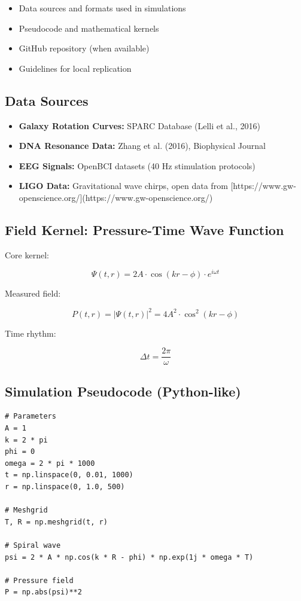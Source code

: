 \documentclass[a4paper,12pt]{article}
\begin{document}
\begin{itemize}
    \item Data sources and formats used in simulations
    \item Pseudocode and mathematical kernels
    \item GitHub repository (when available)
    \item Guidelines for local replication
\end{itemize}

\subsection{Data Sources}

\begin{itemize}
    \item \textbf{Galaxy Rotation Curves:} SPARC Database (Lelli et al., 2016)
    \item \textbf{DNA Resonance Data:} Zhang et al. (2016), Biophysical Journal
    \item \textbf{EEG Signals:} OpenBCI datasets (40 Hz stimulation protocols)
    \item \textbf{LIGO Data:} Gravitational wave chirps, open data from [https://www.gw-openscience.org/](https://www.gw-openscience.org/)
\end{itemize}

\subsection{Field Kernel: Pressure-Time Wave Function}

Core kernel:

\[
\Psi(t, r) = 2A \cdot \cos(k r - \phi) \cdot e^{i \omega t}
\]

Measured field:

\[
P(t, r) = |\Psi(t, r)|^2 = 4A^2 \cdot \cos^2(k r - \phi)
\]

Time rhythm:

\[
\Delta t = \frac{2\pi}{\omega}
\]

\subsection{Simulation Pseudocode (Python-like)}

\begin{verbatim}
# Parameters
A = 1
k = 2 * pi
phi = 0
omega = 2 * pi * 1000
t = np.linspace(0, 0.01, 1000)
r = np.linspace(0, 1.0, 500)

# Meshgrid
T, R = np.meshgrid(t, r)

# Spiral wave
psi = 2 * A * np.cos(k * R - phi) * np.exp(1j * omega * T)

# Pressure field
P = np.abs(psi)**2
\end{verbatim}
\end{document}

